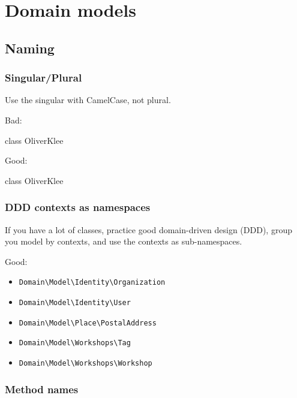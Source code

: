 \chapter{Domain models}

\section{Naming}

\subsection{Singular/Plural}

Use the singular with CamelCase, not plural.

Bad:

\begin{phpcode}
class OliverKlee\Books\Domain\Model{}
\end{phpcode}

Good:

\begin{phpcode}
class OliverKlee\Books\Domain\Model{}
\end{phpcode}


\subsection{DDD contexts as namespaces}

If you have a lot of classes, practice good domain-driven design (DDD), group you model by contexts, and use the contexts as sub-namespaces.

Good:
\begin{itemize}
  \item \texttt{Domain\textbackslash Model\textbackslash Identity\textbackslash Organization}
  \item \texttt{Domain\textbackslash Model\textbackslash Identity\textbackslash User}
  \item \texttt{Domain\textbackslash Model\textbackslash Place\textbackslash PostalAddress}
  \item \texttt{Domain\textbackslash Model\textbackslash Workshops\textbackslash Tag}
  \item \texttt{Domain\textbackslash Model\textbackslash Workshops\textbackslash Workshop}
\end{itemize}


\subsection{Method names}

